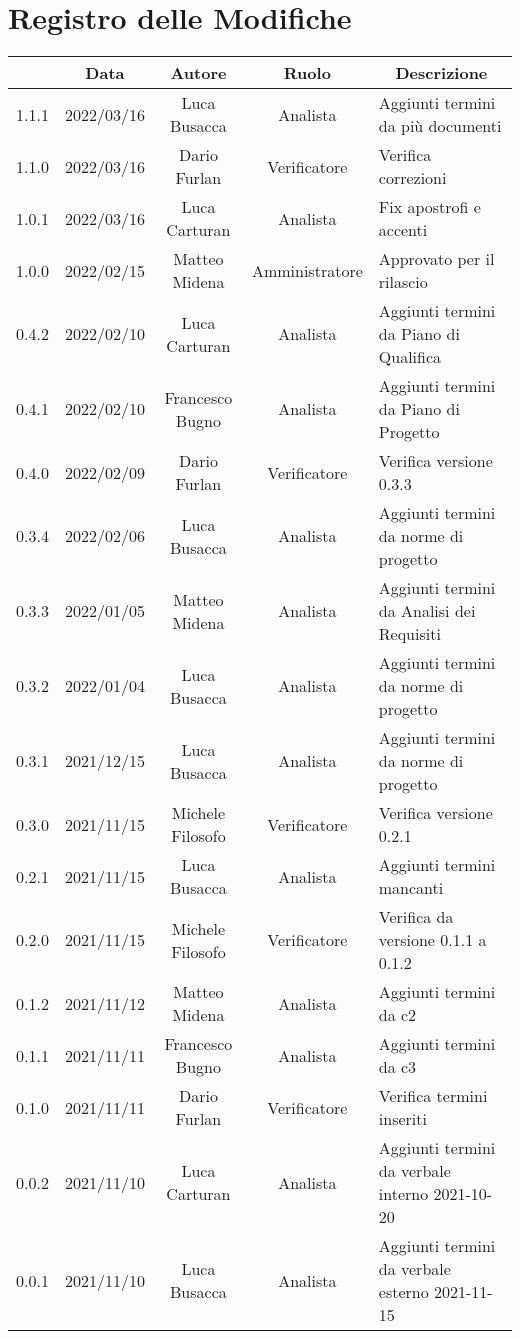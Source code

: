 \thispagestyle{empty}
\section*{Registro delle Modifiche}

\begin{center}
	\renewcommand{\arraystretch}{1.8}
	\begin{longtable}[c]{c | c | c | c | p{5cm}}
		\rowcolor[HTML]{125E28}
		\multicolumn{1}{c}{\color[HTML]{FFFFFF} \textbf{Versione}} & 
		\multicolumn{1}{c}{\color[HTML]{FFFFFF} \textbf{Data}} & 
		\multicolumn{1}{c}{\color[HTML]{FFFFFF} \textbf{Autore}} & 
		\multicolumn{1}{c}{\color[HTML]{FFFFFF} \textbf{Ruolo}} & 
		\multicolumn{1}{c}{\color[HTML]{FFFFFF} \textbf{Descrizione}} \\
		\endhead
		1.1.1 & 2022/03/16 & Luca Busacca & Analista & Aggiunti termini da più documenti\\
		1.1.0 & 2022/03/16 & Dario Furlan & Verificatore & Verifica correzioni\\
		1.0.1 & 2022/03/16 & Luca Carturan & Analista & Fix apostrofi e accenti\\
		1.0.0 & 2022/02/15 & Matteo Midena & Amministratore & Approvato per il rilascio\\
		0.4.2 & 2022/02/10 & Luca Carturan & Analista & Aggiunti termini da Piano di Qualifica\\
		0.4.1 & 2022/02/10 & Francesco Bugno & Analista	& Aggiunti termini da Piano di Progetto\\
		0.4.0 & 2022/02/09 & Dario Furlan & Verificatore & Verifica versione 0.3.3\\
		0.3.4 & 2022/02/06 & Luca Busacca & Analista & Aggiunti termini da norme di progetto\\
		0.3.3 & 2022/01/05 & Matteo Midena & Analista & Aggiunti termini da Analisi dei Requisiti\\
		0.3.2 & 2022/01/04 & Luca Busacca & Analista & Aggiunti termini da norme di progetto\\
		0.3.1 & 2021/12/15 & Luca Busacca & Analista & Aggiunti termini da norme di progetto\\
		0.3.0 & 2021/11/15 & Michele Filosofo & Verificatore & Verifica versione 0.2.1\\
		0.2.1 & 2021/11/15 & Luca Busacca & Analista & Aggiunti termini mancanti\\
		0.2.0 & 2021/11/15 & Michele Filosofo & Verificatore & Verifica da versione 0.1.1 a 0.1.2\\
		0.1.2 & 2021/11/12 & Matteo Midena & Analista & Aggiunti termini da c2\\
		0.1.1 & 2021/11/11 & Francesco Bugno & Analista & Aggiunti termini da c3\\
		0.1.0 & 2021/11/11 & Dario Furlan & Verificatore & Verifica termini inseriti\\
		0.0.2 & 2021/11/10 & Luca Carturan & Analista & Aggiunti termini da verbale interno 2021-10-20\\
		0.0.1 & 2021/11/10 & Luca Busacca & Analista & Aggiunti termini da verbale esterno 2021-11-15\\

	\end{longtable}
\end{center}